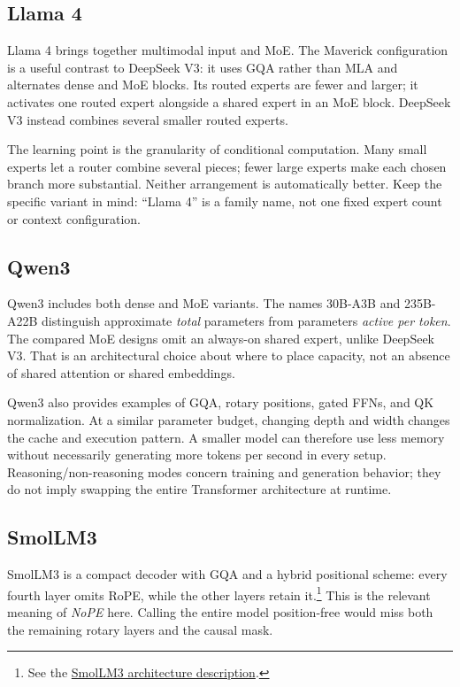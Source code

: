 \documentclass[11pt, oneside]{book}
\let\originalsubsection\subsection
\renewcommand{\subsection}{\Needspace{6\baselineskip}\originalsubsection}
\begin{document}
\subsection{Llama 4}\label{sec:source-5-4-6}
Llama 4 brings together multimodal input and MoE. The Maverick configuration is a useful contrast to DeepSeek V3: it uses GQA rather than MLA and alternates dense and MoE blocks. Its routed experts are fewer and larger; it activates one routed expert alongside a shared expert in an MoE block. DeepSeek V3 instead combines several smaller routed experts.

The learning point is the granularity of conditional computation. Many small experts let a router combine several pieces; fewer large experts make each chosen branch more substantial. Neither arrangement is automatically better. Keep the specific variant in mind: ``Llama 4'' is a family name, not one fixed expert count or context configuration.

\subsection{Qwen3}\label{sec:source-5-4-7}
Qwen3 includes both dense and MoE variants. The names 30B-A3B and 235B-A22B distinguish approximate \emph{total} parameters from parameters \emph{active per token}. The compared MoE designs omit an always-on shared expert, unlike DeepSeek V3. That is an architectural choice about where to place capacity, not an absence of shared attention or shared embeddings.

Qwen3 also provides examples of GQA, rotary positions, gated FFNs, and QK normalization. At a similar parameter budget, changing depth and width changes the cache and execution pattern. A smaller model can therefore use less memory without necessarily generating more tokens per second in every setup. Reasoning/non-reasoning modes concern training and generation behavior; they do not imply swapping the entire Transformer architecture at runtime.

\subsection{SmolLM3}\label{sec:source-5-4-8}
SmolLM3 is a compact decoder with GQA and a hybrid positional scheme: every fourth layer omits RoPE, while the other layers retain it.\footnote{See the \href{https://huggingface.co/blog/smollm3}{SmolLM3 architecture description}.} This is the relevant meaning of \emph{NoPE} here. Calling the entire model position-free would miss both the remaining rotary layers and the causal mask.
\end{document}
